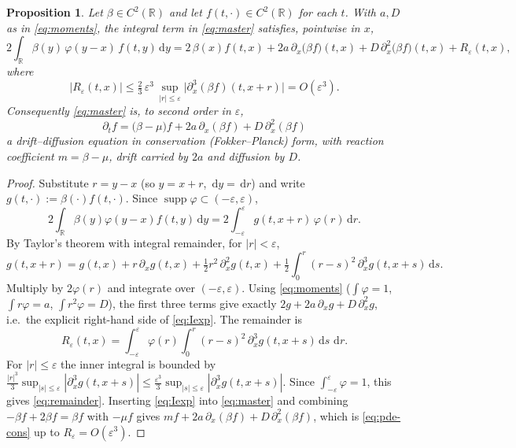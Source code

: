 \documentclass{amsart}
\newtheorem{proposition}{Proposition}
\theoremstyle{definition}
\newcommand{\R}{\mathbb{R}}
\newcommand{\dd}{\,\mathrm{d}}
\DeclareMathOperator{\supp}{supp}
\begin{document}
\begin{proposition}\label{prop:expansion}
Let $\beta\in C^2(\R)$ and let $f(t,\cdot)\in C^2(\R)$ for each $t$. With $a,D$ as in
\eqref{eq:moments}, the integral term in \eqref{eq:master} satisfies, pointwise in $x$,
\begin{equation}\label{eq:Iexp}
2\int_\R \beta(y)\,\varphi(y-x)\,f(t,y)\dd y
= 2\,\beta(x)f(t,x) + 2a\,\partial_x\!\bigl(\beta f\bigr)(t,x)
+ D\,\partial_x^2\!\bigl(\beta f\bigr)(t,x) + R_\varepsilon(t,x),
\end{equation}
where
\begin{equation}\label{eq:remainder}
|R_\varepsilon(t,x)| \le \tfrac{2}{3}\,\varepsilon^3\,
\sup_{|r|\le\varepsilon}\bigl|\partial_x^3(\beta f)(t,x+r)\bigr|
= O(\varepsilon^3).
\end{equation}
Consequently \eqref{eq:master} is, to second order in $\varepsilon$,
\begin{equation}\label{eq:pde-cons}
\boxed{\;\partial_t f = \bigl(\beta-\mu\bigr) f + 2a\,\partial_x(\beta f) + D\,\partial_x^2(\beta f)\;}
\end{equation}
a drift--diffusion equation in conservation (Fokker--Planck) form, with reaction
coefficient $m=\beta-\mu$, drift carried by $2a$ and diffusion by $D$.
\end{proposition}

\begin{proof}
Substitute $r=y-x$ (so $y=x+r$, $\dd y=\dd r$) and write $g(t,\cdot):=\beta(\cdot)f(t,\cdot)$.
Since $\supp\varphi\subset(-\varepsilon,\varepsilon)$,
\[
2\int_\R \beta(y)\varphi(y-x)f(t,y)\dd y
= 2\int_{-\varepsilon}^{\varepsilon} g(t,x+r)\,\varphi(r)\dd r .
\]
By Taylor's theorem with integral remainder, for $|r|<\varepsilon$,
\[
g(t,x+r)= g(t,x) + r\,\partial_x g(t,x) + \tfrac12 r^2\,\partial_x^2 g(t,x)
+ \tfrac12\int_0^r (r-s)^2\,\partial_x^3 g(t,x+s)\dd s .
\]
Multiply by $2\varphi(r)$ and integrate over $(-\varepsilon,\varepsilon)$. Using
\eqref{eq:moments} ($\int\varphi=1$, $\int r\varphi=a$, $\int r^2\varphi=D$), the first three
terms give exactly $2g + 2a\,\partial_x g + D\,\partial_x^2 g$, i.e.\ the explicit right-hand
side of \eqref{eq:Iexp}. The remainder is
\[
R_\varepsilon(t,x)= \int_{-\varepsilon}^{\varepsilon}\!\varphi(r)\!\int_0^r (r-s)^2\,\partial_x^3 g(t,x+s)\dd s\,\dd r .
\]
For $|r|\le\varepsilon$ the inner integral is bounded by
$\frac{|r|^3}{3}\sup_{|s|\le\varepsilon}|\partial_x^3 g(t,x+s)|\le
\frac{\varepsilon^3}{3}\sup_{|s|\le\varepsilon}|\partial_x^3 g(t,x+s)|$. Since
$\int_{-\varepsilon}^\varepsilon \varphi=1$, this gives \eqref{eq:remainder}. Inserting
\eqref{eq:Iexp} into \eqref{eq:master} and combining $-\beta f + 2\beta f=\beta f$ with
$-\mu f$ gives $m f + 2a\,\partial_x(\beta f)+D\,\partial_x^2(\beta f)$, which is
\eqref{eq:pde-cons} up to $R_\varepsilon=O(\varepsilon^3)$.
\end{proof}
\end{document}
